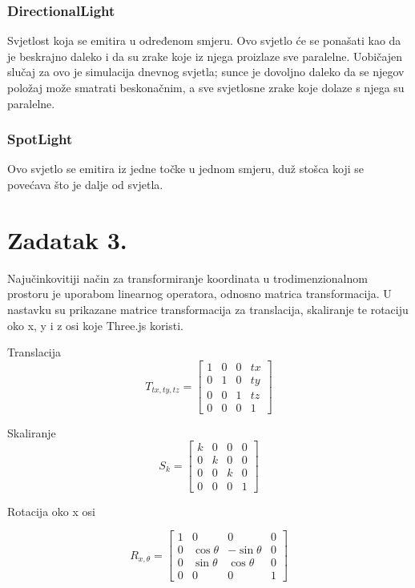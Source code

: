 \documentclass[a4paper,12pt]{article}
\begin{document}
\subsubsection*{DirectionalLight}
\hspace{10mm} Svjetlost koja se emitira u određenom smjeru. Ovo svjetlo će se ponašati kao da je beskrajno daleko i da su zrake koje iz njega proizlaze sve paralelne. Uobičajen slučaj za ovo je simulacija dnevnog svjetla; sunce je dovoljno daleko da se njegov položaj može smatrati beskonačnim, a sve svjetlosne zrake koje dolaze s njega su paralelne.

\subsubsection*{SpotLight}
\hspace{10mm} Ovo svjetlo se emitira iz jedne točke u jednom smjeru, duž stošca koji se povećava što je dalje od svjetla.

\pagebreak


\section*{Zadatak 3.}
Najučinkovitiji način za transformiranje koordinata u trodimenzionalnom prostoru je uporabom
linearnog operatora, odnosno matrica transformacija. U nastavku su prikazane matrice transformacija
za translacija, skaliranje te rotaciju oko x, y i z osi koje Three.js koristi.

Translacija
\[
T_{tx,ty,tz}=
\begin{bmatrix}
    1 & 0 & 0 & tx \\
    0 & 1 & 0 & ty \\
    0 & 0 & 1 & tz \\
    0 & 0 & 0 & 1
\end{bmatrix}
\]

Skaliranje
\[
S_{k}=
\begin{bmatrix}
    k & 0 & 0 & 0 \\
    0 & k & 0 & 0 \\
    0 & 0 & k & 0 \\
    0 & 0 & 0 & 1
\end{bmatrix}
\]

Rotacija oko x osi

\[
R_{x,\theta}=
\begin{bmatrix}
    1 & 0 & 0 & 0 \\
    0 & \cos{\theta} & -\sin{\theta} & 0 \\
    0 & \sin{\theta} & \cos{\theta} & 0 \\
    0 & 0 & 0 & 1
\end{bmatrix}
\]
\end{document}
